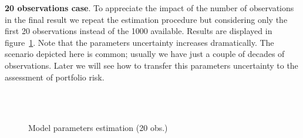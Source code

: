 \documentclass[11pt,fleqn]{book} %
\begin{document}
\begin{example}
	\textbf{20 observations case}. To appreciate the impact of the number of 
	observations in the final result we repeat the estimation procedure 
	but considering only the first 20 observations instead of the 1000 
	available. Results are displayed in figure~\ref{fig:calib3}. Note 
	that the parameters uncertainty increases dramatically. The scenario 
	depicted here is common; usually we have just a couple of decades of 
	observations. Later we will see how to transfer this parameters 
	uncertainty to the assessment of portfolio risk.
	\begin{figure}[!ht]
		\centering
		\hfill
		\\
		\\
		\caption{Model parameters estimation (20 obs.)}
		\label{fig:calib3}
	\end{figure}

\end{example}
\end{document}
